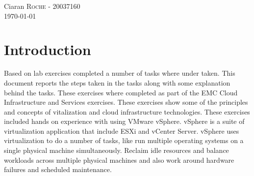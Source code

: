 \begin{titlepage}

\Large Ciaran \textsc{Roche} - 20037160\\[3cm] %


{\large \today}\\[1cm] %


\vfill %

\end{titlepage}


\section{Introduction}

Based on lab exercises completed a number of tasks where under taken. This document reports the steps taken in the tasks along with some explanation behind the tasks. These exercises where completed as part of the EMC Cloud Infrastructure and Services exercises. These exercises show some of the principles and concepts of vitalization and cloud infrastructure technologies.
These exercises included hands on experience with using VMware vSphere. vSphere is a suite of virtualization application that include ESXi and vCenter Server. vSphere uses virtualization to do a number of tasks, like run multiple operating systems on a single physical machine simultaneously. Reclaim idle resources and balance workloads across multiple physical machines and also work around hardware failures and scheduled maintenance.

